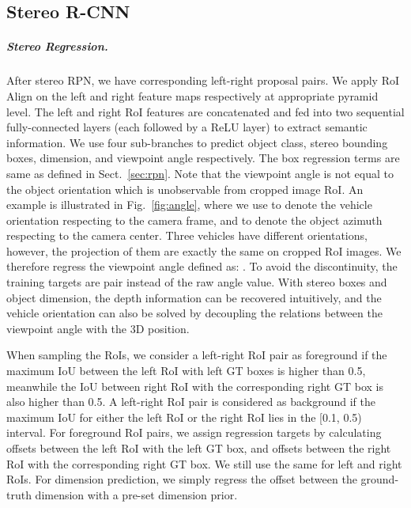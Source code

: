 \documentclass[10pt,twocolumn,letterpaper]{article}
\begin{document}
	\subsection{Stereo R-CNN}
	{\setlength{\parindent}{0cm}
		\subparagraph*{Stereo Regression.}
		\label{sec:stereobox}After stereo RPN, we have corresponding left-right proposal pairs. We apply RoI Align \cite{he2017mask} on the left and right feature maps respectively at appropriate pyramid level. The left and right RoI features are concatenated and fed into two sequential fully-connected layers (each followed by a ReLU layer) to extract semantic information. We use four sub-branches to predict object class, stereo bounding boxes, dimension, and viewpoint angle respectively. The box regression terms are same as defined in Sect.~\ref{sec:rpn}. Note that the viewpoint angle is not equal to the object orientation which is unobservable from cropped image RoI. An example is illustrated in Fig.~\ref{fig:angle}, where we use  to denote the vehicle orientation respecting to the camera frame, and  to denote the object azimuth respecting to the camera center. Three vehicles have different orientations, however, the projection of them are exactly the same on cropped RoI images. We therefore regress the viewpoint angle  defined as: . To avoid the discontinuity, the training targets are  pair instead of the raw angle value. With stereo boxes and object dimension, the depth information can be recovered intuitively, and the vehicle orientation can also be solved by decoupling the relations between the viewpoint angle with the 3D position.
	}
	
	When sampling the RoIs, we consider a left-right RoI pair as foreground if the maximum IoU between the left RoI with left GT boxes is higher than 0.5, meanwhile the IoU between right RoI with the corresponding right GT box is also higher than 0.5. A left-right RoI pair is considered as background if the maximum IoU for either the left RoI or the right RoI lies in the [0.1, 0.5) interval. For foreground RoI pairs, we assign regression targets by calculating offsets between the left RoI with the left GT box, and offsets between the right RoI with the corresponding right GT box. We still use the same  for left and right RoIs. For dimension prediction, we simply regress the offset between the ground-truth dimension with a pre-set dimension prior.
	
\end{document}
